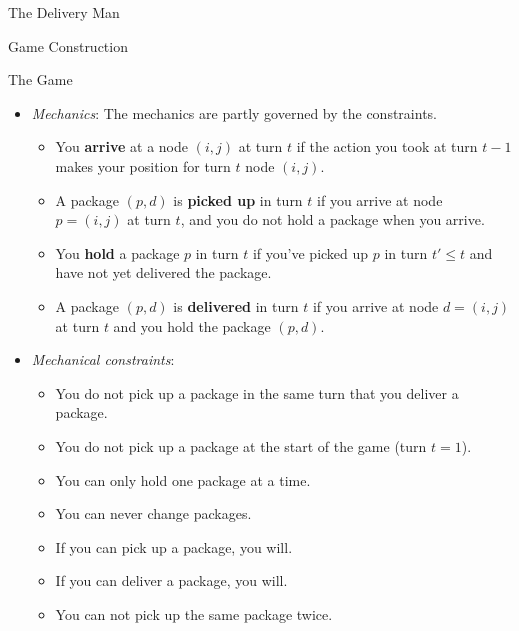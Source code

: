 \begin{section}{The Delivery Man}
\begin{subsection}{Game Construction}
\begin{subsubsection}{The Game}
\begin{itemize}
          If an action is \textbf{valid}, you start turn $t+1$ on the indicated to-node. An action is \textbf{invalid} if the indicated to-node does not exists, in which case the action is taken to be $a_5$ and you remain at the same node at turn $t+1$.\\
          \textbf{Turns} are enumerated by increasing integers starting with $t = 1$. 

        \item \textit{Mechanics}:
          The mechanics are partly governed by the constraints.
          \begin{itemize}
          \item You \textbf{arrive} at a node $(i, j)$ at turn $t$ if the action you took at turn $t-1$ makes your position for turn $t$ node $(i, j)$.
            
          \item A package $(p, d)$ is \textbf{picked up} in turn $t$ if you arrive at node $p = (i, j)$ at turn $t$, and you do not hold a package when you arrive.

          \item You \textbf{hold} a package $p$ in turn $t$ if you've picked up $p$ in turn $t' \leq t$ and have not yet delivered the package. 

          \item A package $(p, d)$ is \textbf{delivered} in turn $t$ if you arrive at node $d = (i, j)$ at turn $t$ and you hold the package $(p, d)$.  

          \end{itemize}
          \newpage
        \item \textit{Mechanical constraints}:
          \begin{itemize}
              \setlength\itemsep{-1em}
          \item You do not pick up a package in the same turn that you deliver a package.
          \item You do not pick up a package at the start of the game (turn $t = 1$).
          \item You can only hold one package at a time.
          \item You can never change packages.
          \item If you can pick up a package, you will.
          \item If you can deliver a package, you will.
          \item You can not pick up the same package twice.
          \end{itemize}
      \end{itemize}


\end{subsubsection}
\end{subsection}
\end{section}
